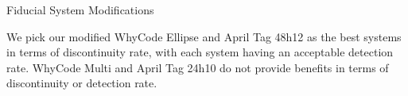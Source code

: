 \documentclass[final, 20pt]{beamer}
\newlength{\colwidth}
\begin{document}
\begin{frame}[t]
\begin{columns}[t]
\begin{column}{\colwidth}
\begin{block}{Fiducial System Modifications}
\begin{figure}[]
\begin{subfigure}[b]{0.49\linewidth}
            \label{figure:violin_plot_speed_five_member}
        \end{subfigure}
    \end{figure}
    \vspace*{-1.5cm}
      We pick our modified WhyCode Ellipse and April Tag 48h12 as the best systems in terms of discontinuity rate,
      with each system having an acceptable detection rate.
      WhyCode Multi and April Tag 24h10 do not provide benefits in terms of discontinuity or detection rate.
  \end{block}

%
%
%


\end{column}
\end{columns}
\end{frame}
\end{document}
